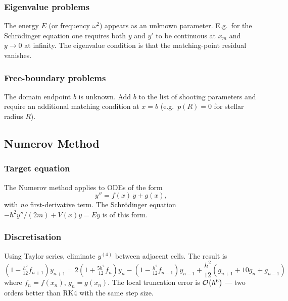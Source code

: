 \subsubsection*{Eigenvalue problems}
The energy $E$ (or frequency $\omega^2$) appears as an unknown parameter.
E.g.\ for the Schrödinger equation one requires both $y$ and $y'$ to
be continuous at $x_m$ and $y\to 0$ at infinity.  The eigenvalue
condition is that the matching-point residual vanishes.

\subsubsection*{Free-boundary problems}
The domain endpoint $b$ is unknown.  Add $b$ to the list of shooting
parameters and require an additional matching condition at $x=b$
(e.g.\ $p(R)=0$ for stellar radius $R$).

\subsection{Numerov Method}\label{subsec:lec13:numerov}

\subsubsection*{Target equation}
The Numerov method applies to ODEs of the form
\begin{equation}
  y'' = f(x)\,y + g(x),
  \label{eq:lec13:numerov_ode}
\end{equation}
with \emph{no} first-derivative term.  The Schrödinger equation
$-\hbar^2 y''/(2m) + V(x)y = Ey$ is of this form.

\subsubsection*{Discretisation}
Using Taylor series, eliminate $y^{(4)}$ between adjacent cells.
The result is
\begin{equation}
  \boxed{
  \left(1 - \tfrac{h^2}{12}f_{n+1}\right)y_{n+1}
  = 2\left(1 + \tfrac{5h^2}{12}f_n\right)y_n
  - \left(1 - \tfrac{h^2}{12}f_{n-1}\right)y_{n-1}
  + \frac{h^2}{12}(g_{n+1}+10g_n+g_{n-1})}
  \label{eq:lec13:numerov}
\end{equation}
where $f_n = f(x_n)$, $g_n = g(x_n)$.
The local truncation error is $\mathcal{O}\!\left(h^6\right)$ — two orders better than
RK4 with the same step size.

